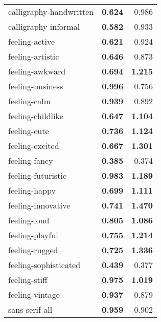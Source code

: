 \begin{longtable}{|l|r|r|}
calligraphy-handwritten   & \textbf{0.624}             & 0.986                   \\
calligraphy-informal      & \textbf{0.582}             & 0.933                   \\
feeling-active            & \textbf{0.621}             & 0.924                   \\
feeling-artistic          & \textbf{0.646}             & 0.873                   \\
feeling-awkward           & \textbf{0.694}             & \textbf{1.215}          \\
feeling-business          & \textbf{0.996}             & 0.756                   \\
feeling-calm              & \textbf{0.939}             & 0.892                   \\
feeling-childlike         & \textbf{0.647}             & \textbf{1.104}          \\
feeling-cute              & \textbf{0.736}             & \textbf{1.124}          \\
feeling-excited           & \textbf{0.667}             & \textbf{1.301}          \\
feeling-fancy             & \textbf{0.385}             & 0.374                   \\
feeling-futuristic        & \textbf{0.983}             & \textbf{1.189}          \\
feeling-happy             & \textbf{0.699}             & \textbf{1.111}          \\
feeling-innovative        & \textbf{0.741}             & \textbf{1.470}          \\
feeling-loud              & \textbf{0.805}             & \textbf{1.086}          \\
feeling-playful           & \textbf{0.755}             & \textbf{1.214}          \\
feeling-rugged            & \textbf{0.725}             & \textbf{1.336}          \\
feeling-sophisticated     & \textbf{0.439}             & 0.377                   \\
feeling-stiff             & \textbf{0.975}             & \textbf{1.019}          \\
feeling-vintage           & \textbf{0.937}             & 0.879                   \\
sans-serif-all            & \textbf{0.959}             & 0.902                   \\

\end{longtable}
